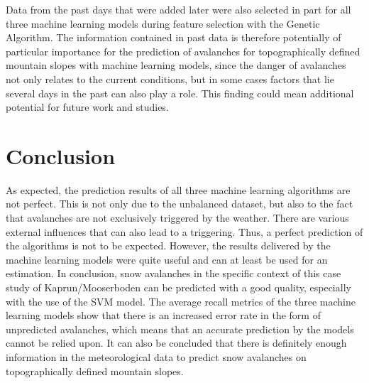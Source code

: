 \documentclass[../masterarbeit.tex]{subfiles}
\begin{document}
Data from the past days that were added later were also selected in part for all three machine learning models during feature selection with the Genetic Algorithm.  The information contained in past data is therefore potentially of particular importance for the prediction of avalanches for topographically defined mountain slopes with machine learning models, since the danger of avalanches not only relates to the current conditions, but in some cases factors that lie several days in the past can also play a role. This finding could mean additional potential for future work and studies.


\section{Conclusion}

As expected, the prediction results of all three machine learning algorithms are not perfect. This is not only due to the unbalanced dataset, but also to the fact that avalanches are not exclusively triggered by the weather. There are various external influences that can also lead to a triggering. Thus, a perfect prediction of the algorithms is not to be expected. However, the results delivered by the machine learning models were quite useful and can at least be used for an estimation. 
In conclusion, snow avalanches in the specific context of this case study of Kaprun/Mooserboden can be predicted with a good quality, especially with the use of the SVM model. The average recall metrics of the three machine learning models show that there is an increased error rate in the form of unpredicted avalanches, which means that an accurate prediction by the models cannot be relied upon.
It can also be concluded that there is definitely enough information in the meteorological data to predict snow avalanches on topographically defined mountain slopes.
\end{document}
